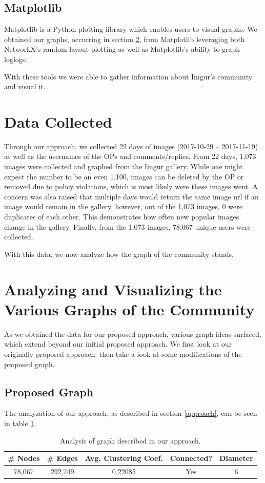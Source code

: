 \documentclass{article}
\begin{document}
\subsection{Matplotlib}
\par Matplotlib is a Python plotting library which enables users to visual graphs\cite{Hunter:2007}. We obtained our graphs, occurring in section \ref{graphs}, from Matplotlib leveraging both NetworkX's random layout plotting as well as Matplotlib's ability to graph loglogs.
\par With these tools we were able to gather information about Imgur's community and visual it.

\section{Data Collected}
\par Through our approach, we collected 22 days of images (2017-10-29 -- 2017-11-19) as well as the usernames of the OPs and comments/replies. From 22 days, 1,073 images were collected and graphed from the Imgur gallery. While one might expect the number to be an even 1,100, images can be deleted by the OP or removed due to policy violations, which is most likely were these images went. A concern was also raised that multiple days would return the same image url if an image would remain in the gallery, however, out of the 1,073 images, 0 were duplicates of each other. This demonstrates how often new popular images change in the gallery. Finally, from the 1,073 images, 78,067 unique users were collected.
\par With this data, we now analyze how the graph of the community stands.

\section{Analyzing and Visualizing the Various Graphs of the Community}\label{graphs}
\par As we obtained the data for our proposed approach, various graph ideas surfaced, which extend beyond our initial proposed approach. We first look at our originally proposed approach, then take a look at some modifications of the proposed graph. 
\subsection{Proposed Graph}
\par The analyzation of our approach, as described in section \ref{approach}, can be seen in table \ref{table:1}. 
\begin{table}
\centering
 \begin{tabular}{||c c c c c||} 
 \hline
 \# Nodes & \# Edges & Avg. Clustering Coef. & Connected? & Diameter \\ [0.5ex] 
 \hline\hline
 78,067 & 292,749 & 0.22085 & Yes & 6 \\ 
 \hline
\end{tabular} 
\caption{Analysis of graph described in our approach.}
\label{table:1}
\end{table}
\end{document}
